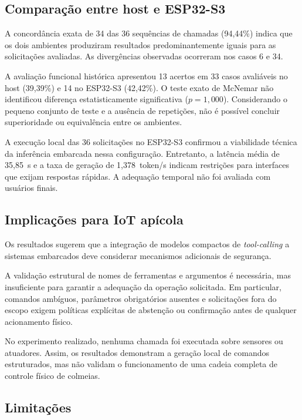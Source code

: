 \documentclass[12pt]{article}
\begin{document}
\subsection{Comparação entre host e ESP32-S3}

A concordância exata de 34 das 36 sequências de
chamadas (94,44\%) indica que os dois ambientes
produziram resultados predominantemente iguais
para as solicitações avaliadas. As divergências
observadas ocorreram nos casos 6 e 34.

A avaliação funcional histórica apresentou
13 acertos em 33 casos avaliáveis no host
(39,39\%) e 14 no ESP32-S3 (42,42\%).
O teste exato de McNemar não identificou
diferença estatisticamente significativa
($p=1{,}000$). Considerando o pequeno
conjunto de teste e a ausência de repetições,
não é possível concluir superioridade ou
equivalência entre os ambientes.

A execução local das 36 solicitações no ESP32-S3 confirmou a viabilidade técnica da inferência embarcada nessa configuração. Entretanto, a latência média de 35,85~s e a taxa de geração de 1,378~token/s indicam restrições para interfaces que exijam respostas rápidas. A adequação temporal não foi avaliada com usuários finais.

\subsection{Implicações para IoT apícola}

Os resultados sugerem que a integração de
modelos compactos de \textit{tool-calling}
a sistemas embarcados deve considerar
mecanismos adicionais de segurança.

A validação estrutural de nomes de ferramentas
e argumentos é necessária, mas insuficiente
para garantir a adequação da operação
solicitada. Em particular, comandos ambíguos,
parâmetros obrigatórios ausentes e solicitações
fora do escopo exigem políticas explícitas
de abstenção ou confirmação antes de qualquer
acionamento físico.

No experimento realizado, nenhuma chamada
foi executada sobre sensores ou atuadores.
Assim, os resultados demonstram a geração
local de comandos estruturados, mas não
validam o funcionamento de uma cadeia
completa de controle físico de colmeias.

\subsection{Limitações}
\end{document}
